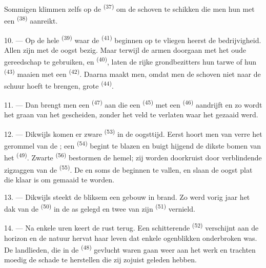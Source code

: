 Sommigen klimmen zelfs op de  \textsuperscript{(37)} om de schoven te schikken die
men hun met een  \textsuperscript{(38)} aanreikt.

10. --- Op de hele  \textsuperscript{(39)} waar de
 \textsuperscript{(41)} beginnen op te vliegen heerst de
bedrijvigheid. Allen zijn met de oogst bezig. Maar terwijl de armen doorgaan met het oude
gereedschap te gebruiken,  en
 \textsuperscript{(40)}, laten de rijke grondbezitters hun
tarwe of hun  \textsuperscript{(43)} maaien met een
 \textsuperscript{(42)}. Daarna maakt men, omdat men de
schoven niet naar de schuur hoeft te brengen, grote 
\textsuperscript{(44)}.

11. --- Dan brengt men een  \textsuperscript{(47)} aan die een
 \textsuperscript{(45)} met een  \textsuperscript{(46)}
aandrijft en zo wordt het graan van het  gescheiden, zonder het veld te verlaten
waar het gezaaid werd.

\VUsaut{5.0mm}
\VUsaut{3.4mm}

12. --- Dikwijls komen er zware  \textsuperscript{(53)} in de oogsttijd.
Eerst hoort men van verre het gerommel van de ; een
 \textsuperscript{(54)} begint te blazen en buigt
hijgend de dikste bomen van het  \textsuperscript{(49)}. Zwarte
 \textsuperscript{(56)} bestormen de hemel; zij worden
doorkruist door verblindende zigzaggen van de  \textsuperscript{(55)}. De
 en soms de  beginnen te vallen, en slaan de oogst plat die klaar
is om gemaaid te worden.

13. --- Dikwijls steekt de bliksem een gebouw in brand. Zo werd vorig jaar het dak van de
 \textsuperscript{(50)} in de as gelegd en twee van zijn 
\textsuperscript{(51)} vernield.

14. --- Na enkele uren keert de rust terug. Een schitterende 
\textsuperscript{(52)} verschijnt aan de horizon en de natuur hervat haar leven dat enkele
ogenblikken onderbroken was. De landlieden, die in de  \textsuperscript{(48)}
gevlucht waren gaan weer aan het werk en trachten moedig de schade te herstellen die zij
zojuist geleden hebben.

